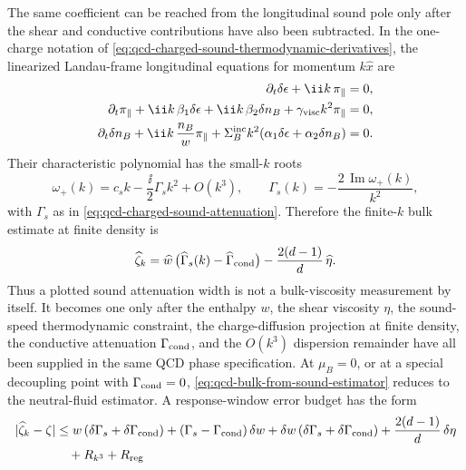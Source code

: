 \begin{controlledapproximation}
The same coefficient can be reached from the longitudinal sound pole only
after the shear and conductive contributions have also been subtracted.  In
the one-charge notation of
\eqref{eq:qcd-charged-sound-thermodynamic-derivatives}, the linearized
Landau-frame longitudinal equations for momentum \(k\hat x\) are
\begin{align}
  \partial_t\delta\epsilon+\ii k\,\pi_\parallel&=0,
  \nonumber\\
  \partial_t\pi_\parallel
  +\ii k\,\beta_1\delta\epsilon
  +\ii k\,\beta_2\delta n_B
  +\gamma_{\rm visc}k^2\pi_\parallel&=0,
  \nonumber\\
  \partial_t\delta n_B
  +\ii k\,\frac{n_B}{w}\pi_\parallel
  +\Sigma_B^{\rm inc}k^2(\alpha_1\delta\epsilon+\alpha_2\delta n_B)&=0.
  \label{eq:qcd-charged-sound-linearized-matrix}
\end{align}
Their characteristic polynomial has the small-\(k\) roots
\begin{equation}
  \omega_+(k)
  =
  c_s k-\frac{\ii}{2}\Gamma_s k^2+O(k^3),
  \qquad
  \Gamma_s(k)=-\frac{2\,\operatorname{Im}\omega_+(k)}{k^2},
  \label{eq:qcd-sound-width-estimator}
\end{equation}
with \(\Gamma_s\) as in \eqref{eq:qcd-charged-sound-attenuation}.  Therefore
the finite-\(k\) bulk estimate at finite density is
\begin{equation}
  \widehat\zeta_k
  =
  \widehat w\,
  \bigl(\widehat\Gamma_s(k)-\widehat\Gamma_{\rm cond}\bigr)
  -
  \frac{2(d-1)}{d}\,\widehat\eta .
  \label{eq:qcd-bulk-from-sound-estimator}
\end{equation}
Thus a plotted sound attenuation width is not a bulk-viscosity measurement by
itself.  It becomes one only after the enthalpy \(w\), the shear viscosity
\(\eta\), the sound-speed thermodynamic constraint, the charge-diffusion
projection at finite density, the conductive attenuation
\(\Gamma_{\rm cond}\), and the \(O(k^3)\) dispersion remainder have all been
supplied in the same QCD phase specification.  At \(\mu_B=0\), or at a special
decoupling point with \(\Gamma_{\rm cond}=0\),
\eqref{eq:qcd-bulk-from-sound-estimator} reduces to the neutral-fluid
estimator.  A response-window
error budget has the form
\begin{align}
  |\widehat\zeta_k-\zeta|
  &\le
  w\,(\delta\Gamma_s+\delta\Gamma_{\rm cond})
  +(\Gamma_s-\Gamma_{\rm cond})\,\delta w
  +\delta w\,(\delta\Gamma_s+\delta\Gamma_{\rm cond})
  +\frac{2(d-1)}d\,\delta\eta
  \nonumber\\
  &\quad
  +R_{k^3}
  +R_{\rm reg}

\end{align}
\end{controlledapproximation}
